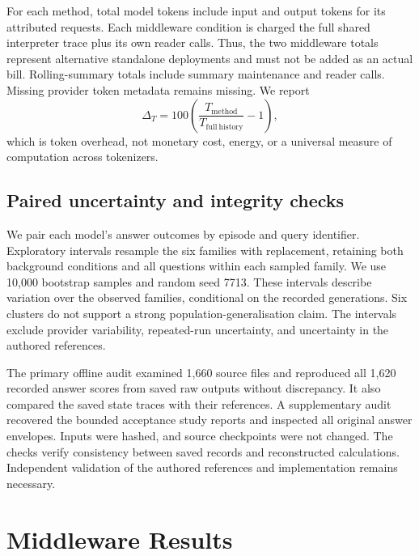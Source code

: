 \documentclass[11pt,a4paper]{article}
\begin{document}
For each method, total model tokens include input and output tokens for its attributed requests. Each middleware condition is charged the full shared interpreter trace plus its own reader calls. Thus, the two middleware totals represent alternative standalone deployments and must not be added as an actual bill. Rolling-summary totals include summary maintenance and reader calls. Missing provider token metadata remains missing. We report
\begin{equation}
\Delta_T=100\left(\frac{T_{\mathrm{method}}}{T_{\mathrm{full\ history}}}-1\right),
\end{equation}
which is token overhead, not monetary cost, energy, or a universal measure of computation across tokenizers.

\subsection{Paired uncertainty and integrity checks}
We pair each model's answer outcomes by episode and query identifier. Exploratory intervals resample the six families with replacement, retaining both background conditions and all questions within each sampled family. We use 10,000 bootstrap samples and random seed 7713. These intervals describe variation over the observed families, conditional on the recorded generations. Six clusters do not support a strong population-generalisation claim. The intervals exclude provider variability, repeated-run uncertainty, and uncertainty in the authored references.

The primary offline audit examined 1,660 source files and reproduced all 1,620 recorded answer scores from saved raw outputs without discrepancy. It also compared the saved state traces with their references. A supplementary audit recovered the bounded acceptance study reports and inspected all original answer envelopes. Inputs were hashed, and source checkpoints were not changed. The checks verify consistency between saved records and reconstructed calculations. Independent validation of the authored references and implementation remains necessary.

\section{Middleware Results}
\end{document}
